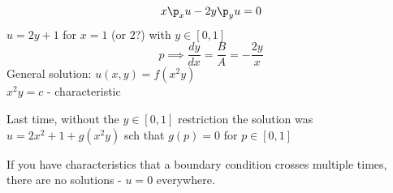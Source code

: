 \documentclass[Maths.tex]{subfiles}
\begin{document}
\begin{example}
\begin{equation}
	x\p_xu - 2y\p_yu = 0
\end{equation}
$u = 2y+1$ for $x = 1$ (or $2$?) with $y \in [0,1]$
\begin{equation}
	p \implies \frac{dy}{dx} = \frac{B}{A} = -\frac{2y}{x}
\end{equation}
General solution: $u(x,y) = f(x^2y)$ \\
$x^2y = c$ - characteristic

Last time, without the $y \in [0,1]$ restriction the solution was $u = 2x^2 + 1 + g(x^2y)$ sch that $g(p) = 0$ for $p \in [0,1]$
\end{example}
If you have characteristics that a boundary condition crosses multiple times, there are no solutions - $u=0$ everywhere.
\end{document}
